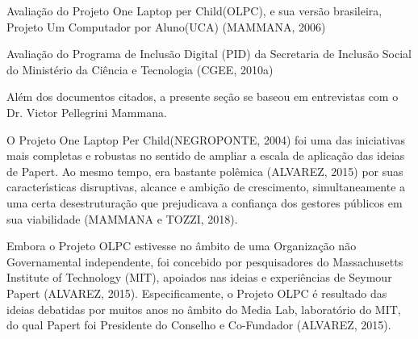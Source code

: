 \documentclass[
12pt,		%
openright,	%
twoside,  %
a4paper,			%
chapter=TITLE,		%
english,			%
french,				%
spanish,			%
brazil				%
]{USPSC-classe/USPSC}
\begin{document}
\begin{alineas}
\item Avalia\c{c}\~ao do Projeto \textquotedbl One Laptop per Child\textquotedbl  (OLPC), e sua vers\~ao brasileira, \textquotedbl Projeto Um Computador por Aluno\textquotedbl  (UCA)  (MAMMANA, 2006)
\item Avalia\c{c}\~ao do Programa de Inclus\~ao Digital (PID) da Secretaria de Inclus\~ao Social do Minist\'erio da Ci\^encia e Tecnologia  (CGEE, 2010a)
\end{alineas}

Al\'em dos documentos citados, a presente se\c{c}\~ao se baseou em entrevistas com o Dr. Victor Pellegrini Mammana.

















O Projeto \textquotedbl One Laptop Per Child\textquotedbl  (NEGROPONTE, 2004) foi uma das iniciativas mais completas e robustas no sentido de ampliar a escala de aplica\c{c}\~ao das ideias de Papert. Ao mesmo tempo, era bastante pol\^emica (ALVAREZ, 2015) por suas caracter\'{\i}sticas disruptivas, alcance e ambi\c{c}\~ao de crescimento, simultaneamente a uma certa desestrutura\c{c}\~ao que prejudicava a confian\c{c}a dos gestores p\'ublicos em sua viabilidade (MAMMANA e TOZZI, 2018).

















Embora o Projeto OLPC estivesse no \^ambito de uma Organiza\c{c}\~ao n\~ao Governamental independente,  foi concebido por pesquisadores do Massachusetts Institute of Technology (MIT), apoiados nas ideias e experi\^encias de Seymour Papert  (ALVAREZ, 2015). Especificamente, o Projeto OLPC \'e resultado das ideias debatidas por muitos anos no \^ambito do Media Lab, laborat\'orio do MIT, do qual Papert foi Presidente do Conselho e Co-Fundador  (ALVAREZ, 2015).
\end{document}
